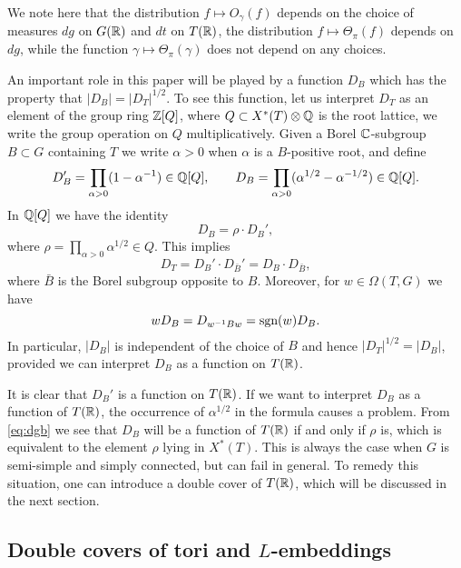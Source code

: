 \documentclass{article}
\theoremstyle{definition}
\numberwithin{equation}{section}
\renewcommand{\-}{\hyp{}}
\begin{document}
We note here that the distribution $f \mapsto O_\gamma(f)$ depends on the choice of measures $dg$ on $G(\mathbb{R})$ and $dt$ on $T(\mathbb{R})$, the distribution $f\mapsto \Theta_\pi(f)$ depends on $dg$, while the function $\gamma \mapsto \Theta_\pi(\gamma)$ does not depend on any choices.

An important role in this paper will be played by a function $D_B$ which has the property that $|D_B|=|D_T|^{1/2}$. To see this function, let us interpret $D_T$ as an element of the group ring $\mathbb{Z}[Q]$, where $Q \subset X^*(T)\otimes\mathbb{Q}$ is the root lattice, we write the group operation on $Q$ multiplicatively. Given a Borel $\mathbb{C}$-subgroup $B \subset G$ containing $T$ we write $\alpha>0$ when $\alpha$ is a $B$-positive root, and define
\begin{equation} \label{eq:weyldenom}
D_B' = \prod_{\alpha>0} (1-\alpha^{-1}) \in \mathbb{Q}[Q],\qquad D_B = \prod_{\alpha>0} (\alpha^{1/2}-\alpha^{-1/2}) \in \mathbb{Q}[Q].
\end{equation}
In $\mathbb{Q}[Q]$ we have the identity
\begin{equation} \label{eq:dgb}
D_B = \rho \cdot D_B',	
\end{equation}
where $\rho=\prod_{\alpha>0} \alpha^{1/2} \in Q$. This implies
\[ D_T = D_B' \cdot D_{\bar B}' = D_B \cdot D_{\bar B}, \]
where $\bar B$ is the Borel subgroup opposite to $B$. Moreover, for $w \in \Omega(T,G)$ we have
\begin{equation} \label{eq:wsd}
wD_B = D_{w^{-1}Bw} = \textrm{sgn}(w)D_B.	
\end{equation}
In particular, $|D_B|$ is independent of the choice of $B$ and hence $|D_T|^{1/2}=|D_B|$, provided we can interpret $D_B$ as a function on $T(\mathbb{R})$.

It is clear that $D_B'$ is a function on $T(\mathbb{R})$. If we want to interpret $D_B$ as a function of $T(\mathbb{R})$, the occurrence of $\alpha^{1/2}$ in the formula causes a problem. From \eqref{eq:dgb} we see that $D_B$ will be a function of $T(\mathbb{R})$ if and only if $\rho$ is, which is equivalent to the element $\rho$ lying in $X^*(T)$. This is always the case when $G$ is semi-simple and simply connected, but can fail in general. To remedy this situation, one can introduce a double cover of $T(\mathbb{R})$, which will be discussed in the next section.

\subsection{Double covers of tori and $L$\-embeddings} \label{sub:covtori}
\end{document}
